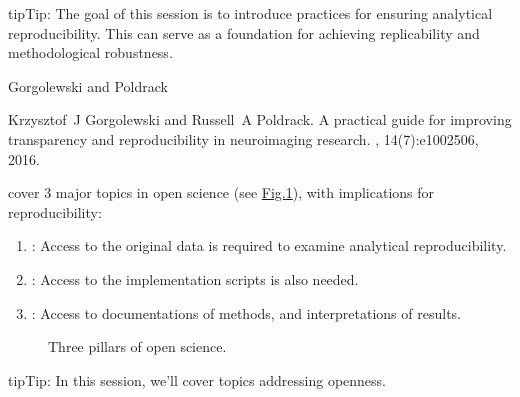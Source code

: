 \documentclass[letterpaper,10pt,english]{jupyterBook}
\let\sphinxpxdimen\pdfpxdimen\else\newdimen\sphinxpxdimen
\begin{document}
\begin{sphinxadmonition}{tip}{Tip:}
\sphinxAtStartPar
The goal of this session is to introduce practices for ensuring analytical reproducibility. This can serve as a foundation for achieving replicability and methodological robustness.
\end{sphinxadmonition}

\sphinxAtStartPar
Gorgolewski and Poldrack%
\begin{footnote}[3]\sphinxAtStartFootnote
Krzysztof J Gorgolewski and Russell A Poldrack. A practical guide for improving transparency and reproducibility in neuroimaging research. , 14(7):e1002506, 2016.
%
\end{footnote} cover 3 major topics in open science (see \hyperref[\detokenize{chapters/01/reproducibility-in-neuroimaging:os-pillars}]{Fig.\@ \ref{\detokenize{chapters/01/reproducibility-in-neuroimaging:os-pillars}}}), with implications for reproducibility:
\begin{enumerate}
%
\item {} 
\sphinxAtStartPar
{}: Access to the original data is required to examine analytical reproducibility.

\item {} 
\sphinxAtStartPar
{}: Access to the implementation scripts is also needed.

\item {} 
\sphinxAtStartPar
{}: Access to documentations of methods, and interpretations of results.

\end{enumerate}

\begin{figure}[htbp]
\centering
\capstart

\noindent\sphinxincludegraphics[height=400\sphinxpxdimen]{{pillars}.png}
\caption{Three pillars of open science.\sphinxfootnotemark[3]}\label{\detokenize{chapters/01/reproducibility-in-neuroimaging:os-pillars}}\end{figure}

\begin{sphinxadmonition}{tip}{Tip:}
\sphinxAtStartPar
In this session, we’ll cover topics addressing  openness.
\end{sphinxadmonition}
\end{document}
